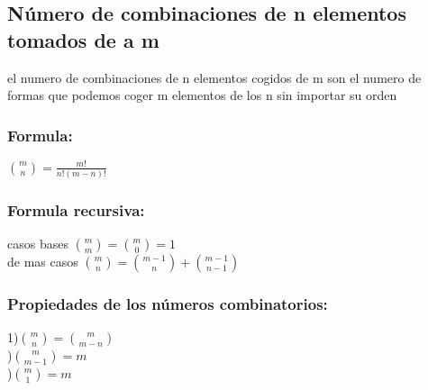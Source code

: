 \subsection{Número de combinaciones de n elementos tomados de a m}
el numero de combinaciones de n elementos cogidos de m son el numero de formas que podemos coger m elementos de los n sin importar su orden\\
\subsubsection{Formula:}
$\binom{m}{n}=\frac{m!}{n!(m-n)!}$
\subsubsection{Formula recursiva:}
  casos bases $\binom{m}{m}=\binom{m}{0}=1$\\
  \indent de mas casos $\binom{m}{n}=\binom{m-1}{n}+\binom{m-1}{n-1}$
\subsubsection{Propiedades de los números combinatorios:}
  1)$\binom{m}{n}=\binom{m}{m-n}$\\
  )$\binom{m}{m-1}=m$\\
  )$\binom{m}{1}=m$
